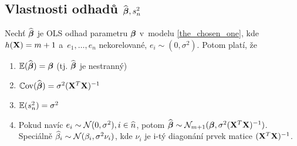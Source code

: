 \subsection{Vlastnosti odhadů $\widehat{\boldsymbol{\beta}}, s_n^2$ }
\begin{theorem}
	Nechť $\widehat{\boldsymbol{\beta}}$ je OLS odhad parametru $\boldsymbol{\beta}$ v~modelu \eqref{the_chosen_one}, kde $h(\mathbf{X}) = m+1$ a~$e_1,\dots, e_n$ nekorelované, $e_i \sim (0,\sigma^2)$. Potom platí, že
	\begin{enumerate}
		\item $\mathbb{E}(\widehat{\boldsymbol{\beta}}) = \boldsymbol{\beta}$ (tj. $\widehat{\boldsymbol{\beta}}$ je nestranný)
		\item $\mathbb{C}\mathrm{ov}(\widehat{\boldsymbol{\beta}}) = \sigma^2 (\mathbf{X}^T \mathbf{X})^{-1}$
		\item $\mathbb{E}(s_n^2) = \sigma^2$
		\item Pokud navíc $e_i \sim \mathcal{N}(0,\sigma^2), i\in\widehat{n} $, potom $\widehat{\boldsymbol{\beta}} \sim \mathcal{N}_{m+1}(\boldsymbol{\beta}, \sigma^2(\mathbf{X}^T \mathbf{X})^{-1})$. Speciálně $\widehat{\beta}_i \sim \mathcal{N}(\beta_i, \sigma^2 \nu_i)$, kde $\nu_i$ je i-tý diagonání prvek matice $(\mathbf{X}^T \mathbf{X})^{-1}$.
	\end{enumerate}
\end{theorem}

